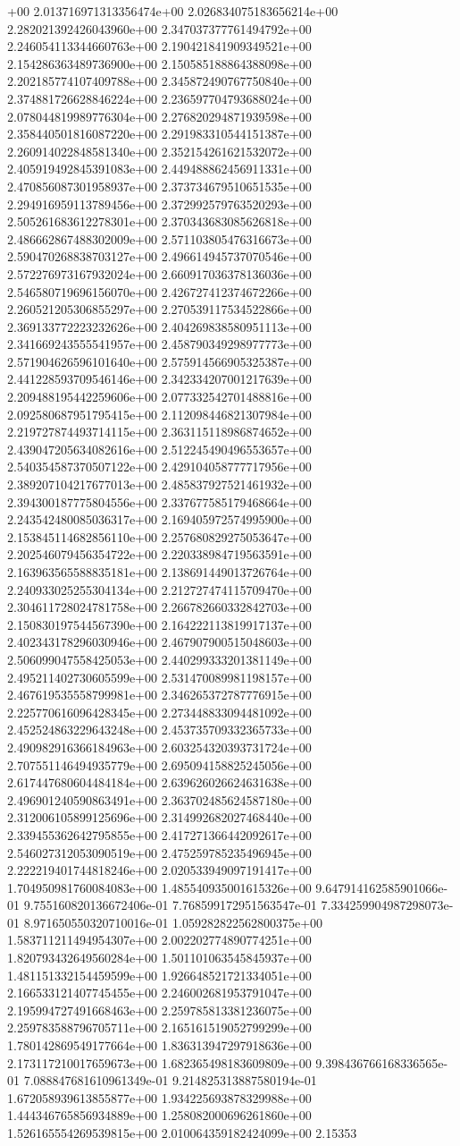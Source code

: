 +00	2.013716971313356474e+00	2.026834075183656214e+00	2.282021392426043960e+00	2.347037377761494792e+00	2.246054113344660763e+00	2.190421841909349521e+00	2.154286363489736900e+00	2.150585188864388098e+00	2.202185774107409788e+00	2.345872490767750840e+00	2.374881726628846224e+00	2.236597704793688024e+00	2.078044819989776304e+00	2.276820294871939598e+00	2.358440501816087220e+00	2.291983310544151387e+00	2.260914022848581340e+00	2.352154261621532072e+00	2.405919492845391083e+00	2.449488862456911331e+00	2.470856087301958937e+00	2.373734679510651535e+00	2.294916959113789456e+00	2.372992579763520293e+00	2.505261683612278301e+00	2.370343683085626818e+00	2.486662867488302009e+00	2.571103805476316673e+00	2.590470268838703127e+00	2.496614945737070546e+00	2.572276973167932024e+00	2.660917036378136036e+00	2.546580719696156070e+00	2.426727412374672266e+00	2.260521205306855297e+00	2.270539117534522866e+00	2.369133772223232626e+00	2.404269838580951113e+00	2.341669243555541957e+00	2.458790349298977773e+00	2.571904626596101640e+00	2.575914566905325387e+00	2.441228593709546146e+00	2.342334207001217639e+00	2.209488195442259606e+00	2.077332542701488816e+00	2.092580687951795415e+00	2.112098446821307984e+00	2.219727874493714115e+00	2.363115118986874652e+00	2.439047205634082616e+00	2.512245490496553657e+00	2.540354587370507122e+00	2.429104058777717956e+00	2.389207104217677013e+00	2.485837927521461932e+00	2.394300187775804556e+00	2.337677585179468664e+00	2.243542480085036317e+00	2.169405972574995900e+00	2.153845114682856110e+00	2.257680829275053647e+00	2.202546079456354722e+00	2.220338984719563591e+00	2.163963565588835181e+00	2.138691449013726764e+00	2.240933025255304134e+00	2.212727474115709470e+00	2.304611728024781758e+00	2.266782660332842703e+00	2.150830197544567390e+00	2.164222113819917137e+00	2.402343178296030946e+00	2.467907900515048603e+00	2.506099047558425053e+00	2.440299333201381149e+00	2.495211402730605599e+00	2.531470089981198157e+00	2.467619535558799981e+00	2.346265372787776915e+00	2.225770616096428345e+00	2.273448833094481092e+00	2.452524863229643248e+00	2.453735709332365733e+00	2.490982916366184963e+00	2.603254320393731724e+00	2.707551146494935779e+00	2.695094158825245056e+00	2.617447680604484184e+00	2.639626026624631638e+00	2.496901240590863491e+00	2.363702485624587180e+00	2.312006105899125696e+00	2.314992682027468440e+00	2.339455362642795855e+00	2.417271366442092617e+00	2.546027312053090519e+00	2.475259785235496945e+00	2.222219401744818246e+00	2.020533949097191417e+00	1.704950981760084083e+00	1.485540935001615326e+00	9.647914162585901066e-01	9.755160820136672406e-01	7.768599172951563547e-01	7.334259904987298073e-01	8.971650550320710016e-01	1.059282822562800375e+00	1.583711211494954307e+00	2.002202774890774251e+00	1.820793432649560284e+00	1.501101063545845937e+00	1.481151332154459599e+00	1.926648521721334051e+00	2.166533121407745455e+00	2.246002681953791047e+00	2.195994727491668463e+00	2.259785813381236075e+00	2.259783588796705711e+00	2.165161519052799299e+00	1.780142869549177664e+00	1.836313947297918636e+00	2.173117210017659673e+00	1.682365498183609809e+00	9.398436766168336565e-01	7.088847681610961349e-01	9.214825313887580194e-01	1.672058939613855877e+00	1.934225693878329988e+00	1.444346765856934889e+00	1.258082000696261860e+00	1.526165554269539815e+00	2.010064359182424099e+00	2.15353